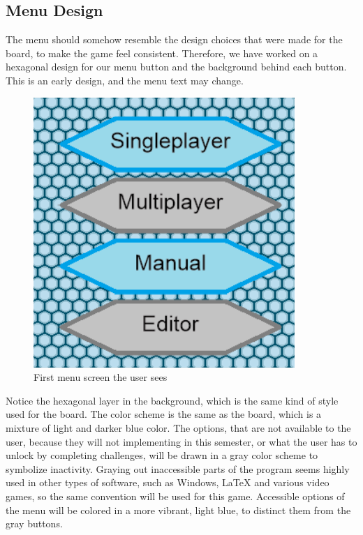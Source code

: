 
\subsection{Menu Design}
The menu should somehow resemble the design choices that were made for the board, to make the game feel consistent.
Therefore, we have worked on a hexagonal design for our menu button and the background behind each button.
This is an early design, and the menu text may change.\newline

\begin{figure}[ht]
	\centering
		\includegraphics{img/Menu1.png}
	\caption{First menu screen the user sees}
	\label{fig:menu1}
\end{figure}

Notice the hexagonal layer in the background, which is the same kind of style used for the board.
The color scheme is the same as the board, which is a mixture of light and darker blue color. 
The options, that are not available to the user, because they will not implementing in this semester, or what the user has to unlock by completing challenges, will be drawn in a gray color scheme to symbolize inactivity.
Graying out inaccessible parts of the program seems highly used in other types of software, such as Windows, LaTeX and various video games, so the same convention will be used for this game.
Accessible options of the menu will be colored in a more vibrant, light blue, to distinct them from the gray buttons.\newline

